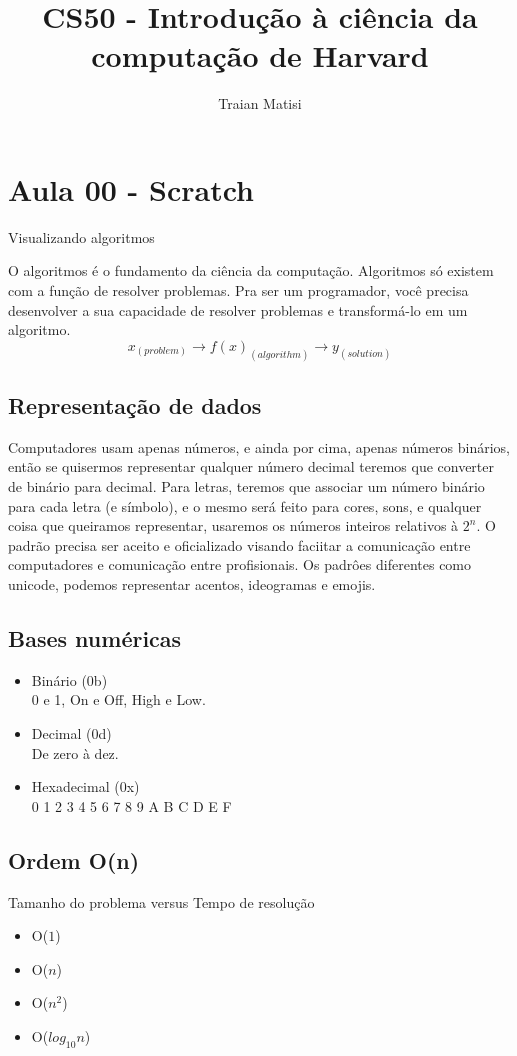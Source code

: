 \documentclass[12pt,a4paper]{article} %
\author{Traian Matisi}
\title{CS50 - Introdução à ciência da computação de Harvard}
\begin{document}
\maketitle

\section{Aula 00 - Scratch}
Visualizando algoritmos

O algoritmos é o fundamento da ciência da computação. Algoritmos só existem com a função de resolver problemas. Pra ser um programador, você precisa desenvolver a sua capacidade de resolver problemas e transformá-lo em um algoritmo. $$x_{(problem)}\rightarrow f(x)_{(algorithm)}\rightarrow y_{(solution)}$$

\subsection{Representação de dados}
Computadores usam apenas números, e ainda por cima, apenas números binários, então se quisermos representar qualquer número decimal teremos que converter de binário para decimal. Para letras, teremos que associar um número binário para cada letra (e símbolo), e o mesmo será feito para cores, sons, e qualquer coisa que queiramos representar, usaremos os números inteiros relativos à $2^n$. O padrão precisa ser aceito e oficializado visando faciitar a comunicação entre computadores e comunicação entre profisionais. Os padrôes diferentes como unicode, podemos representar acentos, ideogramas e emojis.

\subsection{Bases numéricas}
\begin{itemize}
\item Binário (0b)\\ 0 e 1, On e Off, High e Low. 
\item Decimal (0d)\\ De zero à dez.
\item Hexadecimal (0x)\\0 1 2 3 4 5 6 7 8 9 A B C D E F
\end{itemize}

\subsection{Ordem O(n)}
Tamanho do problema versus Tempo de resolução
\begin{itemize}
\item O($1$)
\item O($n$)
\item O($n^2$)
\item O($log_{10}n$)
\end{itemize}
\end{document}
